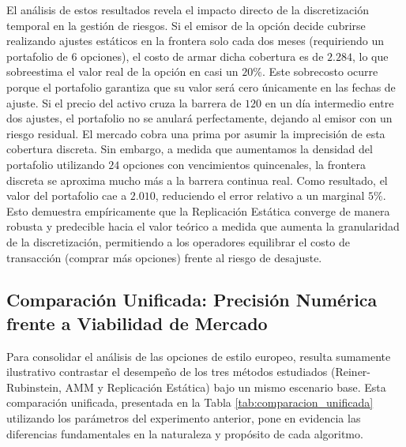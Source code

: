 El análisis de estos resultados revela el impacto directo de la discretización temporal en la gestión de riesgos. Si el emisor de la opción decide cubrirse realizando ajustes estáticos en la frontera solo cada dos meses (requiriendo un portafolio de $6$ opciones), el costo de armar dicha cobertura es de $2.284$, lo que sobreestima el valor real de la opción en casi un $20\%$. Este sobrecosto ocurre porque el portafolio garantiza que su valor será cero únicamente en las fechas de ajuste. Si el precio del activo cruza la barrera de $120$ en un día intermedio entre dos ajustes, el portafolio no se anulará perfectamente, dejando al emisor con un riesgo residual. El mercado cobra una prima por asumir la imprecisión de esta cobertura discreta.
Sin embargo, a medida que aumentamos la densidad del portafolio utilizando $24$ opciones con vencimientos quincenales, la frontera discreta se aproxima mucho más a la barrera continua real. Como resultado, el valor del portafolio cae a $2.010$, reduciendo el error relativo a un marginal $5\%$. Esto demuestra empíricamente que la Replicación Estática converge de manera robusta y predecible hacia el valor teórico a medida que aumenta la granularidad de la discretización, permitiendo a los operadores equilibrar el costo de transacción (comprar más opciones) frente al riesgo de desajuste.

\subsection{Comparación Unificada: Precisión Numérica frente a Viabilidad de Mercado}

Para consolidar el análisis de las opciones de estilo europeo, resulta sumamente ilustrativo contrastar el desempeño de los tres métodos estudiados (Reiner-Rubinstein, AMM y Replicación Estática) bajo un mismo escenario base. Esta comparación unificada, presentada en la Tabla \ref{tab:comparacion_unificada} utilizando los parámetros del experimento anterior, pone en evidencia las diferencias fundamentales en la naturaleza y propósito de cada algoritmo.

\begin{table}[H]
  \centering
  \small
  \caption{Comparación Unificada de Métodos para Opciones Europeas}
  \label{tab:comparacion_unificada}
\end{table}

